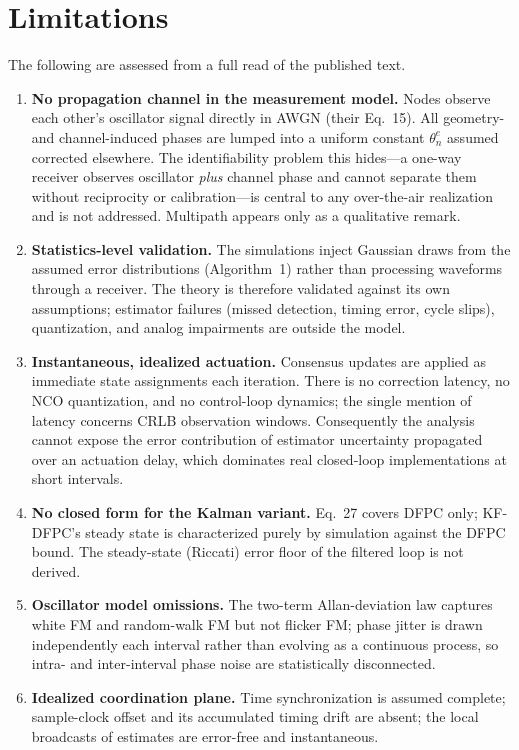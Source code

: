 \documentclass[10pt]{article}
\begin{document}
\section{Limitations}
The following are assessed from a full read of the published text.
\begin{enumerate}
\item \textbf{No propagation channel in the measurement model.} Nodes
observe each other's oscillator signal directly in AWGN (their Eq.~15).
All geometry- and channel-induced phases are lumped into a uniform constant
$\theta_n^e$ assumed corrected elsewhere. The identifiability problem this
hides---a one-way receiver observes oscillator \emph{plus} channel phase and
cannot separate them without reciprocity or calibration---is central to any
over-the-air realization and is not addressed. Multipath appears only as a
qualitative remark.
\item \textbf{Statistics-level validation.} The simulations inject Gaussian
draws from the assumed error distributions (Algorithm~1) rather than
processing waveforms through a receiver. The theory is therefore validated
against its own assumptions; estimator failures (missed detection, timing
error, cycle slips), quantization, and analog impairments are outside the
model.
\item \textbf{Instantaneous, idealized actuation.} Consensus updates are
applied as immediate state assignments each iteration. There is no
correction latency, no NCO quantization, and no control-loop dynamics; the
single mention of latency concerns CRLB observation windows. Consequently
the analysis cannot expose the error contribution of estimator uncertainty
propagated over an actuation delay, which dominates real closed-loop
implementations at short intervals.
\item \textbf{No closed form for the Kalman variant.} Eq.~27 covers DFPC
only; KF-DFPC's steady state is characterized purely by simulation against
the DFPC bound. The steady-state (Riccati) error floor of the filtered loop
is not derived.
\item \textbf{Oscillator model omissions.} The two-term Allan-deviation law
captures white FM and random-walk FM but not flicker FM; phase jitter is
drawn independently each interval rather than evolving as a continuous
process, so intra- and inter-interval phase noise are statistically
disconnected.
\item \textbf{Idealized coordination plane.} Time synchronization is assumed
complete; sample-clock offset and its accumulated timing drift are absent;
the local broadcasts of estimates are error-free and instantaneous.
\end{enumerate}
\end{document}
